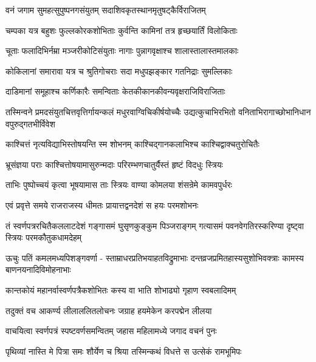 \twolineshloka
{वनं जगाम सुमहत्सुपुष्पनगसंयुतम्}
{सदाशिवकृतस्थानमृतुषट्कैर्विराजितम्}%

\twolineshloka
{चम्पका यत्र बहुशः फुल्लकोरकशोभिताः}
{कुर्वन्ति कामिनां तत्र हृच्छयार्तिं विलोकिताः}%

\twolineshloka
{चूताः फलादिभिर्नम्रा मञ्जरीकोटिसंयुताः}
{नागाः पुन्नागवृक्षाश्च शालास्तालास्तमालकाः}%

\twolineshloka
{कोकिलानां समारावा यत्र च श्रुतिगोचराः}
{सदा मधुपझङ्कार गतनिद्राः सुमल्लिकाः}%

\twolineshloka
{दाडिमानां समूहाश्च कर्णिकारैः समन्विताः}
{केतकीकानकीवन्यवृक्षराजिविराजिताः}%

\twolineshloka
{तस्मिन्वने प्रमदसंयुतचित्तवृत्तिर्गायन्कलं मधुरवाग्विचिकीर्षयोच्चैः}
{उद्यत्कुचाभिरभितो वनिताभिरागाच्छोभानिधान वपुरुद्गतभीर्विवेश}%

\twolineshloka
{काश्चित्तं नृत्यविद्याभिस्तोषयन्ति स्म शोभनम्}
{काश्चिद्गानकलाभिश्च काश्चिद्वाक्चतुरोचितैः}%

\twolineshloka
{भ्रूसंज्ञया पराः काश्चित्तोषयामासुरुन्मदाः}
{परिरम्भणचातुर्यैस्तं हृष्टं विदधुः स्त्रियः}%

\twolineshloka
{ताभिः पुष्पोच्चयं कृत्वा भूषयामास ताः स्त्रियः}
{वाण्या कोमलया शंसन्रेमे कामवपुर्धरः}%

\twolineshloka
{एवं प्रवृत्ते समये राजराजस्य धीमतः}
{प्रायात्तद्वनदेशं स हयः परमशोभनः}%

\fourlineindentedshloka
{तं स्वर्णपत्ररचितैकललाटदेशं}
{गङ्गासमं घुसृणकुङ्कुम पिञ्जराङ्गम्}
{गत्यासमं पवनवेगतिरस्करिण्या}
{दृष्ट्वा स्त्रियः परमकौतुकधामदेहम्}%

\fourlineindentedshloka
{ऊचुः पतिं कमलमध्यपिशङ्गवर्णा -}
{स्ताम्राधरप्रतिभयाहतविद्रुमाभाः}
{दन्तव्रजप्रमितहास्यसुशोभिवक्त्राः}
{कामस्य बाणनयनादिविमोहनाभाः}%


\twolineshloka
{कान्तकोयं महानर्वास्वर्णपत्रैकशोभितः}
{कस्य वा भाति शोभाढ्यो गृहाण स्वबलादिमम्}%


\twolineshloka
{तदुक्तं वच आकर्ण्य लीलाललितलोचनः}
{जग्राह हयमेकेन करपद्मेन लीलया}%

\twolineshloka
{वाचयित्वा स्वर्णपत्रं स्पष्टवर्णसमन्वितम्}
{जहास महिलामध्ये जगाद वचनं पुनः}%


\twolineshloka
{पृथिव्यां नास्ति मे पित्रा समः शौर्येण च श्रिया}
{तस्मिन्कथं विधत्ते स उत्सेकं रामभूमिपः}%

